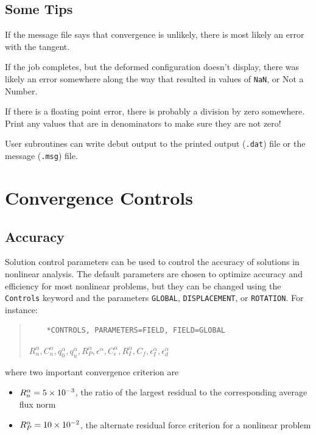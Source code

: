 \documentclass[10pt,letterpaper,oneside]{report}
\begin{document}
\begin{itemize}
\subsection{Some Tips}
If the message file says that convergence is unlikely, there is most likely an error with the tangent.

If the job completes, but the deformed configuration doesn't display, there was likely an error somewhere along the way that resulted in values of \texttt{NaN}, or Not a Number.  

If there is a floating point error, there is probably a division by zero somewhere.  Print any values that are in denominators to make sure they are not zero!

User subroutines can write debut output to the printed output (\texttt{.dat}) file or the message (\texttt{.msg}) file. 




\section{Convergence Controls}
\subsection{Accuracy}
Solution control parameters can be used to control the accuracy of solutions in nonlinear analysis.  The default parameters are chosen to optimize accuracy and efficiency for most nonlinear problems, but they can be changed using the \texttt{Controls} keyword and the parameters \texttt{GLOBAL}, \texttt{DISPLACEMENT}, or \texttt{ROTATION}.  For instance:
\begin{quote} 
    \begin{lstlisting}
    *CONTROLS, PARAMETERS=FIELD, FIELD=GLOBAL
    \end{lstlisting} 
    $R_n^\alpha, C_n^\alpha, q_0^\alpha, q_u^\alpha, R_P^\alpha, \epsilon^\alpha, C_\epsilon^\alpha, R^\alpha_I, C_f, \epsilon^\alpha_I, \epsilon^\alpha_d$
\end{quote}
where two important convergence criterion are
\begin{itemize}
\item $R_n^\alpha = \num{5E-3}$, the ratio of the largest residual to the corresponding average flux norm
\item $R_P^\alpha = \num{10E-2}$, the alternate residual force criterion for a nonlinear problem
\end{itemize}



\end{itemize}
\end{document}
